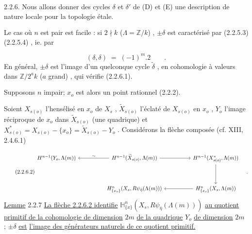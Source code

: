 2.2.6. Nous allons donner des cycles  $\delta$  et  $\delta'$  de  (D) et (E) une description de nature locale pour la topologie étale.

Le cas où  $n$  est pair est facile : si  $2 \nmid k$  ($\Lambda = \mathbb{Z}/k$)  ,  $\pm \delta$  est caractérisé par (2.2.5.3) (2.2.5.4) , ie. par

\begin{equation}\tag{2.2.6.1}
(\delta,\delta) \;=\; (-1)^{m}.2 \qquad .
\end{equation}
En général,  $\pm \delta$  est l'image d'un quelconque cycle  $\widetilde{\delta}$ , en cohomologie à valeurs dans  $\mathbb{Z}/2^{a}k$  ($a$  grand) , qui vérifie (2.2.6.1).

Supposons  $n$  impair; $x_o$  est alors un point rationnel (2.2.2).

Soient  $X_{s(o)}$  l'hensélisé en  $x_o$  de  $X_s$ ,  $\widetilde{X}_{s(o)}$  l'éclaté de  $X_{s(o)}$  en  $x_o$ ,  $Y_o$  l'image réciproque de  $x_o$  dans  $\widetilde{X}_{s(o)}$  (une quadrique) et  $X^{*}_{s(o)} = X_{s(o)} - \{x_o\} = \widetilde{X}_{s(o)} - Y_o$ . Considérons la flèche composée  (cf. XIII, 2.4.6.1)

\begin{equation}\tag{2.2.6.2}
\begin{tikzcd}[column sep=huge, row sep=huge]
H^{n-1}(Y_o,\Lambda(m)) & H^{n-1}(\widetilde{X}_{s(o)},\Lambda(m)) \arrow[l,"\sim"'] \arrow[r] & H^{n-1}(X^{*}_{s(o)},\Lambda(m)) \arrow[d] \\
{} & H^{n}_{\{x_o\}}(X_s,R\psi_{\bar{\eta}}(\Lambda(m))) & H^{n}_{\{x_o\}}(X_s,\Lambda(m)) \arrow[l]
\end{tikzcd}\quad .
\end{equation}
\underline{Lemme} 2.2.7  \underline{La flèche 2.2.6.2 identifie}  $\mathbb{H}^{n}_{\{x\}}(X_s,R\psi_{\bar{\eta}}(\Lambda(m)))$  \underline{au quotient primitif de la cohomologie de dimension}  $2m$  \underline{de la quadrique}  $Y_o$  \underline{de dimension}  $2m$  ;  $\pm \delta$  \underline{est}
\underline{l'image des générateurs naturels de ce quotient primitif.}

